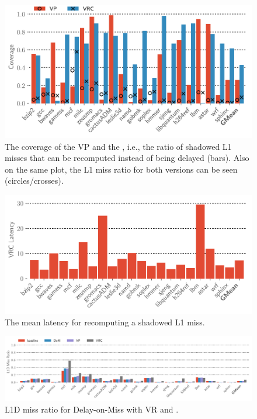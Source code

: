 \begin{figure}[t]
  \includegraphics[width=\columnwidth]{figs/coverage.pdf}
  \caption{The coverage of the VP and the \recomp, i.e., the ratio of shadowed L1 misses that can be recomputed instead of being delayed (bars). Also on the same plot, the L1 miss ratio for both versions can be seen (circles/crosses).}
  \label{fig:coverage}
\end{figure}

\begin{figure}[t]
  \includegraphics[width=\columnwidth]{figs/vrc_latency.pdf}
  \caption{The mean latency for recomputing a shadowed L1 miss.}
  \label{fig:rc-latency}
\end{figure}

\begin{figure}[t]
  \includegraphics[width=\textwidth]{figs/l1d_miss_ratio.pdf}
  \caption{L1D miss ratio for Delay-on-Miss with VR and \recomp.}
  \label{fig:l1d_misses}
\end{figure}

